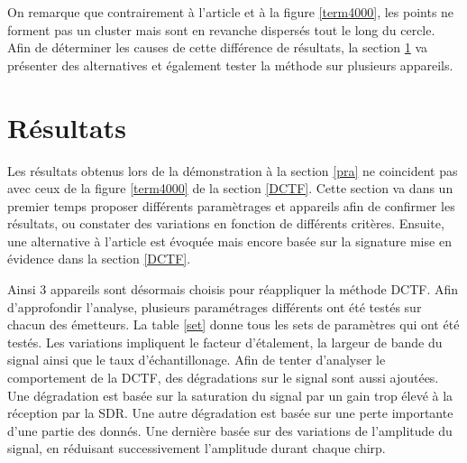 On remarque que contrairement à l'article et à la figure \ref{term4000}, les points ne forment pas un cluster mais sont en revanche dispersés tout le long du cercle. Afin de déterminer les causes de cette différence de résultats, la section \ref{result} va présenter des alternatives et également tester la méthode sur plusieurs appareils.

\section{Résultats}\label{result}

Les résultats obtenus lors de la démonstration à la section  \ref{pra} ne coincident pas avec ceux de la figure \ref{term4000} de la section \ref{DCTF}. Cette section va dans un premier temps proposer différents paramètrages et appareils afin de confirmer les résultats, ou constater des variations en fonction de différents critères. Ensuite, une alternative à l'article est évoquée mais encore basée sur la signature mise en évidence dans la section \ref{DCTF}. 

Ainsi 3 appareils sont désormais choisis pour réappliquer la méthode DCTF. Afin d'approfondir l'analyse, plusieurs paramétrages différents ont été testés sur chacun des émetteurs. La table \ref{set} donne tous les sets de paramètres qui ont été testés. Les variations impliquent le facteur d'étalement, la largeur de bande du signal ainsi que le taux d'échantillonage. Afin de tenter d'analyser le comportement de la DCTF, des dégradations sur le signal sont aussi ajoutées. Une dégradation est basée sur la saturation du signal par un gain trop élevé à la réception par la SDR. Une autre dégradation est basée sur une perte importante d'une partie des donnés. Une dernière basée sur des variations  de l'amplitude du signal, en réduisant successivement l'amplitude durant chaque chirp.

